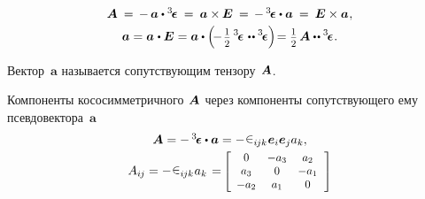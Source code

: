 \begin{otherlanguage}{russian}
\nopagebreak\vspace{-0.1em}\begin{equation}\label{companionvector}
\begin{array}{c}
\bm{A} \:=\, - \, \bm{a} \dotp \levicivitatensor \:=\: \bm{a} \times\hspace{-0.1ex} \bm{E} \:=\, - \, \levicivitatensor \dotp \bm{a} \:=\: \bm{E} \times \bm{a} \hspace{0.1ex},\\[.3em]
%
\bm{a} = \bm{a} \hspace{.1ex} \dotp \bm{E} = \bm{a} \dotp \left( \! - \displaystyle \hspace{0.2ex} \smalldisplaystyleonehalf \hspace{.4ex} \levicivitatensor \hspace{0.2ex} \dotdotp \levicivitatensor \right) \hspace{-0.4ex} = \displaystyle \smalldisplaystyleonehalf \hspace{.32ex} \bm{A} \dotdotp \levicivitatensor \hspace{0.1ex}.
\end{array}
\end{equation}

\vspace{-0.1em} \noindent Вектор~$\bm{a}$ называется сопутствующим тензору~${\hspace{-0.2ex}\bm{A}}$.

Компоненты кососимметричного~${\hspace{-0.2ex}\bm{A}}$ через компоненты сопутствующего ему псевдовектора~$\bm{a}$
\vspace{0.2em}\[\begin{array}{c}
\bm{A} = - \, \levicivitatensor \dotp \bm{a} = - \hspace{0.1ex} \levicivita_{i\hspace{-0.1ex}jk} \hspace{0.1ex} \bm{e}_i \bm{e}_j a_k ,\\[0.3em]
A_{i\hspace{-0.1ex}j} = - \hspace{0.1ex} \levicivita_{i\hspace{-0.1ex}jk} \hspace{0.1ex} a_k \hspace{0.1em} = \hspace{-0.1em}
\scalebox{0.9}[0.9]{$\left[ \begin{array}{ccc}
0 & -a_3 & a_2 \\
a_3 & 0 & -a_1 \\
-a_2 & a_1 & 0
\end{array} \hspace{0.25ex}\right]$}
\end{array}\]


\end{otherlanguage}

